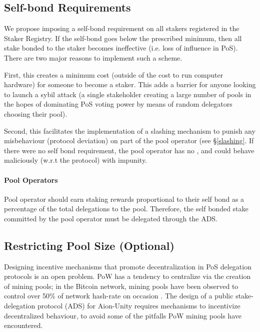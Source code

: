\subsection{Self-bond Requirements} \label{self_bond}
We propose imposing a self-bond requirement on all stakers registered in the Staker Registry. If the self-bond goes below the prescribed minimum, then all stake bonded to the staker becomes ineffective (i.e. loss of influence in PoS). There are two major reasons to implement such a scheme.

First, this creates a minimum cost (outside of the cost to run computer hardware) for someone to become a staker. This adds a barrier for anyone looking to launch a sybil attack (a single stakeholder creating a large number of pools in the hopes of dominating PoS voting power by means of random delegators choosing their pool). 
 
Second, this facilitates the implementation of a slashing mechanism to punish any misbehaviour (protocol deviation) on part of the pool operator (see \S\ref{slashing}. If there were no self bond requirement, the pool operator has no , and could behave maliciously (w.r.t the protocol) with impunity. 

\paragraph{Pool Operators} Pool operator should earn staking rewards proportional to their self bond as a percentage of the total delegations to the pool. Therefore, the self bonded stake committed by the pool operator must be delegated through the ADS. 

\subsection{Restricting Pool Size (Optional)} \label{self_bond_percentage}
Designing incentive mechanisms that promote decentralization in PoS delegation protocols is an open problem. PoW has a tendency to centralize via the creation of mining pools; in the Bitcoin network, mining pools have been observed to control over 50\% of network hash-rate on occasion \cite{RJZ+19}. The design of a public stake-delegation protocol (ADS) for Aion-Unity requires mechanisms to incentivize decentralized behaviour, to avoid some of the pitfalls PoW mining pools have encountered. 

